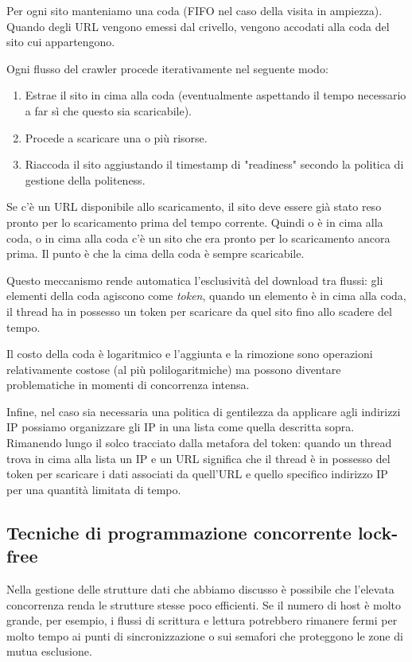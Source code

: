 Per ogni sito manteniamo una coda (FIFO nel caso della visita in ampiezza). Quando degli URL vengono emessi dal crivello, vengono accodati alla coda del sito cui appartengono.

Ogni flusso del crawler procede iterativamente nel seguente modo:
\begin{enumerate}
    \item Estrae il sito in cima alla coda (eventualmente aspettando il tempo necessario a far sì che questo sia scaricabile).
    \item Procede a scaricare una o più risorse.
    \item Riaccoda il sito aggiustando il timestamp di "readiness" secondo la politica di gestione della politeness.
\end{enumerate}
Se c'è un URL disponibile allo scaricamento, il sito deve essere già stato reso pronto per lo scaricamento prima del tempo corrente. Quindi o è in cima alla coda, o in cima alla coda c'è un sito che era pronto per lo scaricamento ancora prima. Il punto è che la cima della coda è sempre scaricabile.

Questo meccanismo rende automatica l'esclusività del download tra flussi: gli elementi della coda agiscono come \textit{token}, quando un elemento è in cima alla coda, il thread ha in possesso un token per scaricare da quel sito fino allo scadere del tempo.

Il costo della coda è logaritmico e l'aggiunta e la rimozione sono operazioni relativamente costose (al più polilogaritmiche) ma possono diventare problematiche in momenti di concorrenza intensa.

Infine, nel caso sia necessaria una politica di gentilezza da applicare agli indirizzi IP possiamo organizzare gli IP in una lista come quella descritta sopra. Rimanendo lungo il solco tracciato dalla metafora del token: quando un thread trova in cima alla lista un IP e un URL significa che il thread è in possesso del token per scaricare i dati associati da quell'URL e quello specifico indirizzo IP per una quantità limitata di tempo.
\subsection{Tecniche di programmazione concorrente lock-free}
Nella gestione delle strutture dati che abbiamo discusso è possibile che l'elevata concorrenza renda le strutture stesse poco efficienti. Se il numero di host è molto grande, per esempio, i flussi di scrittura e lettura potrebbero rimanere fermi per molto tempo ai punti di sincronizzazione o sui semafori che proteggono le zone di mutua esclusione.

